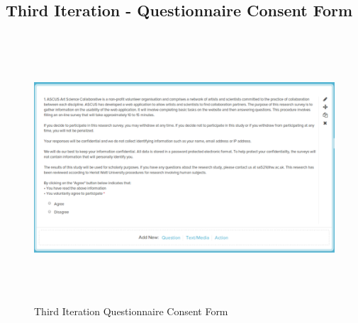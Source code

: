 \documentclass[a4paper,oneside,11pt]{report}
\begin{document}
\begin{appendices}
\subsection{Third Iteration - Questionnaire Consent Form}
\begin{figure}[!ht]
\centering
\includegraphics[width=17cm,height=10cm]{appendix/second-iteration-questionnaire-consent-form.png}
\caption{Third Iteration Questionnaire Consent Form}
\end{figure}

\pagebreak


\end{appendices}
\end{document}
